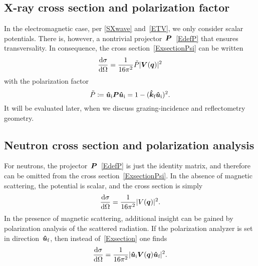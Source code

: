 \subsection{X-ray cross section and polarization factor}\label{Spolfac}

In the electromagnetic case,
per \cref{SXwave} and~\cref{ETV},
we only consider scalar potentials.
There is, however, a nontrivial projector~$\bm{P}$~\cref{EdefP}
that ensures transversality.
In consequence, the cross section~\cref{ExsectionPsi} can be written
\begin{equation}\label{ExsectionX}
  \xElas
  = \frac{1}{16\pi^2} \tilde{P} |\TV(\v{q})|^2
\end{equation}
with the polarization factor
\begin{equation}
  \tilde{P}
  \coloneqq \bm{\hat u}_{\text{i}}\bm{P}\bm{\hat u}_{\text{i}}
  = 1 - (\bm{\hat k}_{\text{f}}\bm{\hat u}_{\text{i}})^2.
\end{equation}
It will be evaluated later, %
when we discuss grazing-incidence and reflectometry geometry.

\subsection{Neutron cross section and polarization analysis}\label{Spolan}

For neutrons, the projector~$\bm{P}$~\cref{EdefP}
is just the identity matrix,
and therefore can be omitted from the cross section~\cref{ExsectionPsi}.
In the absence of magnetic scattering, the potential is scalar,
and the cross section is simply
\begin{equation}\label{ExsectionN}
  \xElas
  = \frac{1}{16\pi^2} |V(\v{q})|^2.
\end{equation}
In the presence of magnetic scattering,
additional insight can be gained by polarization analysis of the scattered radiation.
If the polarization analyzer is set in direction~${\bm{\hat u}}_{\text{f}}$,
then instead of~\cref{Exsection} one finds
\begin{equation}\label{ExsectionNpol}
  \xElas
  = \frac{1}{16\pi^2} |\hu_\si \TV(\v{q})\hu_\sf|^2.
\end{equation}

